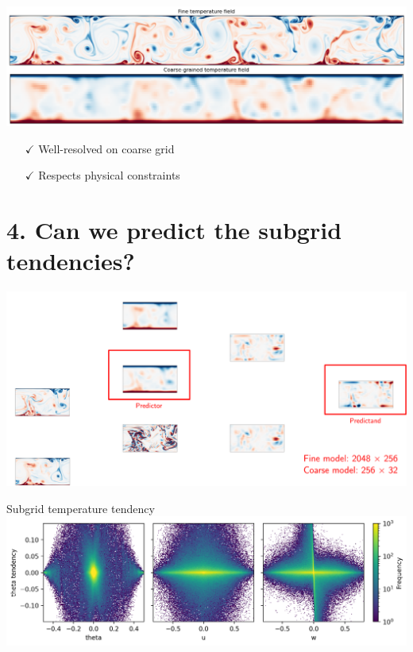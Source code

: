\documentclass[12pt, aspectratio=169]{beamer}
\begin{document}
\begin{frame}
\begin{center}
    \includegraphics[width=\linewidth]{figures/new_coarse_grain.png}
\end{center}
\begin{itemize}
    \item[$\checkmark$] Well-resolved on coarse grid
    \item[$\checkmark$] Respects physical constraints
\end{itemize}
\end{frame}

\section{4. Can we predict the subgrid tendencies?}

\begin{frame}
\centering
\includegraphics[width=\linewidth]{figures/method7.pdf}
\end{frame}

\begin{frame}{Subgrid temperature tendency}
\centering
\includegraphics[width=\linewidth]{figures/theta_tend.png}
\end{frame}
\end{document}
